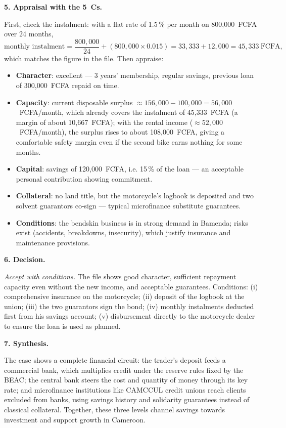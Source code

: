 \documentclass[11pt]{article}
\begin{document}
\textbf{5. Appraisal with the 5~Cs.}\par
First, check the instalment: with a flat rate of 1.5\,\% per month on 800,000~FCFA over 24 months,
\[ \text{monthly instalment} = \frac{800{,}000}{24} + (800{,}000 \times 0.015) = 33{,}333 + 12{,}000 = 45{,}333\ \text{FCFA}, \]
which matches the figure in the file. Then appraise:
\begin{itemize}
\item \textbf{Character}: excellent --- 3 years' membership, regular savings, previous loan of 300,000~FCFA repaid on time.
\item \textbf{Capacity}: current disposable surplus $\approx 156{,}000 - 100{,}000 = 56{,}000$~FCFA/month, which already covers the instalment of 45,333~FCFA (a margin of about 10,667~FCFA); with the rental income ($\approx 52{,}000$~FCFA/month), the surplus rises to about 108,000~FCFA, giving a comfortable safety margin even if the second bike earns nothing for some months.
\item \textbf{Capital}: savings of 120,000~FCFA, i.e. 15\,\% of the loan --- an acceptable personal contribution showing commitment.
\item \textbf{Collateral}: no land title, but the motorcycle's logbook is deposited and two solvent guarantors co-sign --- typical microfinance substitute guarantees.
\item \textbf{Conditions}: the bendskin business is in strong demand in Bamenda; risks exist (accidents, breakdowns, insecurity), which justify insurance and maintenance provisions.
\end{itemize}

\textbf{6. Decision.}\par
\emph{Accept with conditions.} The file shows good character, sufficient repayment capacity even without the new income, and acceptable guarantees. Conditions: (i) comprehensive insurance on the motorcycle; (ii) deposit of the logbook at the union; (iii) the two guarantors sign the bond; (iv) monthly instalments deducted first from his savings account; (v) disbursement directly to the motorcycle dealer to ensure the loan is used as planned.

\textbf{7. Synthesis.}\par
The case shows a complete financial circuit: the trader's deposit feeds a commercial bank, which multiplies credit under the reserve rules fixed by the BEAC; the central bank steers the cost and quantity of money through its key rate; and microfinance institutions like CAMCCUL credit unions reach clients excluded from banks, using savings history and solidarity guarantees instead of classical collateral. Together, these three levels channel savings towards investment and support growth in Cameroon.
\end{document}
